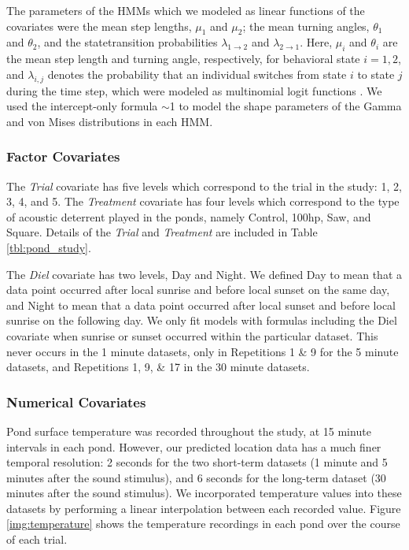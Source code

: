 \documentclass[12pt]{article}
\begin{document}
		The parameters of the HMMs which we modeled as linear functions of the covariates were the mean step lengths, $\mu_1$ and $\mu_2$; the mean turning angles, $\theta_1$ and $\theta_2$, and the statetransition probabilities $\lambda_{1 \to 2}$ and $\lambda_{2 \to 1}$. Here, $\mu_i$ and $\theta_i$ are the mean step length and turning angle, respectively, for behavioral state $i = 1, 2$, and $\lambda_{i, j}$ denotes the probability that an individual switches from state $i$ to state $j$ during the time step, which were modeled as multinomial logit functions \cite{Michelot2016}. We used the intercept-only formula $\sim$1 to model the shape parameters of the Gamma and von Mises distributions in each HMM.
		
		\subsubsection{Factor Covariates}
		
			The \emph{Trial} covariate has five levels which correspond to the trial in the study: 1, 2, 3, 4, and 5. The \emph{Treatment} covariate has four levels which correspond to the type of acoustic deterrent played in the ponds, namely Control, 100hp, Saw, and Square. Details of the \emph{Trial} and \emph{Treatment} are included in Table \ref{tbl:pond_study}.
			
			The \emph{Diel} covariate has two levels, Day and Night. We defined Day to mean that a data point occurred after local sunrise and before local sunset on the same day, and Night to mean that a data point occurred after local sunset and before local sunrise on the following day. We only fit models with formulas including the Diel covariate when sunrise or sunset occurred within the particular dataset. This never occurs in the 1 minute datasets, only in Repetitions 1 \& 9 for the 5 minute datasets, and Repetitions 1, 9, \& 17 in the 30 minute datasets.
		
		\subsubsection{Numerical Covariates} \label{sec:num-cov}
		
			Pond surface temperature was recorded throughout the study, at 15 minute intervals in each pond. However, our predicted location data has a much finer temporal resolution: 2 seconds for the two short-term datasets (1 minute and 5 minutes after the sound stimulus), and 6 seconds for the long-term dataset (30 minutes after the sound stimulus). We incorporated temperature values into these datasets by performing a linear interpolation between each recorded value. Figure \ref{img:temperature} shows the temperature recordings in each pond over the course of each trial.
			
\end{document}
